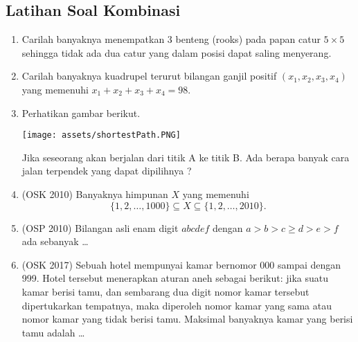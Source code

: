\subsection{Latihan Soal Kombinasi}
\begin{enumerate}   
    \item  Carilah banyaknya menempatkan 3 benteng (rooks) pada papan catur $5 \times 5$ sehingga tidak ada dua catur yang dalam posisi dapat saling menyerang.

    \item Carilah banyaknya kuadrupel terurut bilangan ganjil positif $(x_1, x_2, x_3, x_4)$ yang memenuhi $x_1 + x_2 + x_3 + x_4 = 98$.

    \item Perhatikan gambar berikut. 
    
    \texttt{[image: assets/shortestPath.PNG]} 
    
    Jika seseorang akan berjalan dari titik A ke titik B. Ada berapa banyak cara jalan terpendek yang dapat dipilihnya ?

    \item (OSK 2010) Banyaknya himpunan $X$ yang memenuhi 
    $$\{1,2,\dots,1000\} \subseteq X \subseteq \{1,2,\dots,2010\}.$$

    \item (OSP 2010) Bilangan asli enam digit $abcdef$ dengan $a > b > c \ge d > e > f$ ada sebanyak \dots
    
    \item (OSK 2017)
	Sebuah hotel mempunyai kamar bernomor 000 sampai dengan 999. Hotel tersebut menerapkan aturan aneh sebagai berikut: jika suatu kamar berisi tamu, dan sembarang dua digit nomor kamar tersebut dipertukarkan tempatnya, maka diperoleh nomor kamar yang sama atau nomor kamar yang tidak berisi tamu. Maksimal banyaknya kamar yang berisi tamu adalah \dots
\end{enumerate}